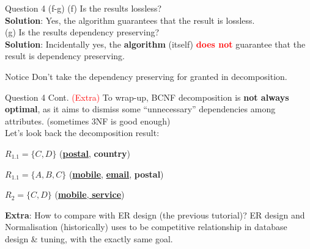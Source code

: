 \begin{frame}[fragile]{Question 4 (f-g)}
(f) Is the results lossless?\\\vspace{5pt}
\textbf{Solution}: Yes, the algorithm guarantees that the result is lossless.\\
\vspace{30pt}
(g) Is the results dependency preserving?\\\vspace{5pt}
\textbf{Solution}:
Incidentally yes, the \textbf{algorithm} (itself) \textcolor{red}{\textbf{does not}} guarantee that the result is dependency preserving.\\
\begin{alertblock}{Notice}
	Don't take the dependency preserving for granted in decomposition.
\end{alertblock}

\end{frame}

\begin{frame}[fragile]{Question 4 Cont. \textcolor{red}{(Extra)}}
To wrap-up, BCNF decomposition is \textbf{not always optimal}, as it aims to dismiss some ``unnecessary'' dependencies among attributes. (sometimes 3NF is good enough)\\\vspace{5pt}
Let's look back the decomposition result:

$R_{1.1}=\{C, D\}$ (\textbf{\underline{postal}}, \textbf{country})

$R_{1.1}=\{A, B, C\}$ (\textbf{\underline{mobile}}, \textbf{\underline{email}}, \textbf{postal})

$R_{2}=\{C, D\}$ (\underline{\textbf{mobile}, \textbf{service}})\\\vspace{5pt}

\textbf{Extra}:
How to compare with ER design (the previous tutorial)? ER design and Normalisation (historically) uses to be competitive relationship in database design \& tuning, with the exactly same goal.\\\vspace{5pt}
\end{frame}

